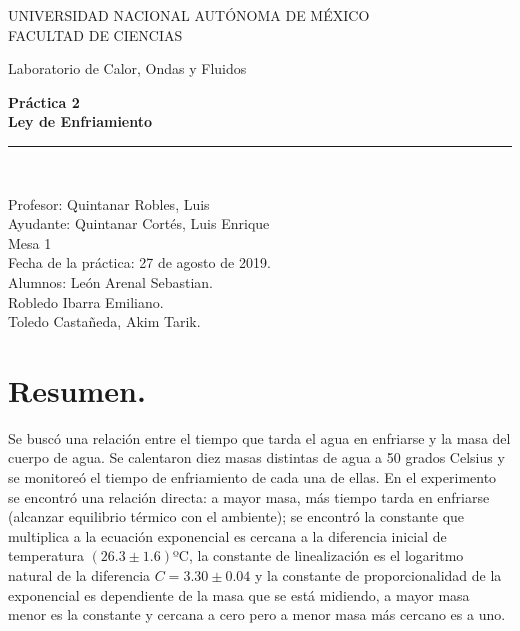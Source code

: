 \documentclass[a4paper]{article}
\begin{document}
\begin{titlepage}
\begin{center}
\begin{figure}
\end{figure}
\vspace*{0.5in}
UNIVERSIDAD NACIONAL AUTÓNOMA DE MÉXICO\\
\vspace*{0.2in}
FACULTAD DE CIENCIAS \\
\vspace*{0.5in}
\begin{large}
Laboratorio de Calor, Ondas y Fluidos\\
\end{large}
\vspace*{0.2in}
\begin{Large}
\textbf{Práctica 2} \\
\textbf{Ley de Enfriamiento} \\
\end{Large}
\vspace*{0.3in}
\vspace*{0.3in}
\rule{80mm}{0.1mm}\\
\vspace*{0.1in}
\begin{large}
Profesor:  Quintanar Robles, Luis  \\
Ayudante: Quintanar Cortés, Luis Enrique \\
Mesa 1\\
Fecha de la práctica: 27 de agosto de 2019.\\
Alumnos: León Arenal Sebastian.\\
Robledo Ibarra Emiliano. \\
Toledo Castañeda, Akim Tarik.\\

\end{large}
\end{center}
\end{titlepage}


\section{Resumen.}
Se buscó una relación entre el tiempo que tarda el agua en enfriarse y la masa del cuerpo de agua. Se calentaron diez masas distintas de agua a 50 grados Celsius y se monitoreó el tiempo de enfriamiento de cada una de ellas. En el experimento se encontró una relación directa: a mayor masa, más tiempo tarda en enfriarse (alcanzar equilibrio térmico con el ambiente); se encontró la constante que multiplica a la ecuación exponencial es cercana a la diferencia inicial de temperatura $(26.3\pm1.6)$ºC, la constante de linealización es el logaritmo natural de la diferencia $C = 3.30 \pm 0.04$ y la constante de proporcionalidad de la exponencial es dependiente de la masa que se está midiendo, a mayor masa menor es la constante y cercana a cero pero a menor masa más cercano es a uno.
\end{document}
